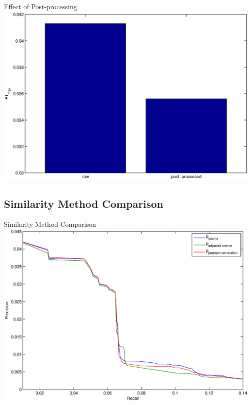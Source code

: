 \documentclass{beamer}
\begin{document}
\begin{frame}{Effect of Post-processing}
\includegraphics[width=\linewidth]{./post-proc_f1.eps}
\end{frame}



\subsection{Similarity Method Comparison}

\begin{frame}{Similarity Method Comparison}
\includegraphics[width=\linewidth]{./sim_compare.eps}
\end{frame}
\end{document}
